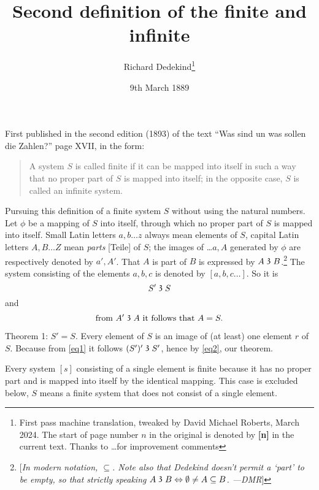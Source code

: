 \documentclass[leqno]{article}
\newcommand\partof{\mathrel{\raisebox{0.45ex}{$\mathfrak{3}$}}}
\begin{document}
\title{Second definition of the finite and infinite}
\author{Richard Dedekind\thanks{First pass machine translation, tweaked by David Michael Roberts, March 2024. The start of page number $n$ in the original is denoted by \textbf{[n]} in the current text. Thanks to \ldots for improvement comments}}
\date{9th March 1889}
\maketitle

First published in the second edition (1893) of the text ``Was sind un was sollen die Zahlen?'' page XVII, in the form: 

\begin{quote}
A system $S$ is called finite if it can be mapped into itself in such a way that no proper part of $S$ is mapped into itself; in the opposite case, $S$ is called an infinite system.
\end{quote}

Pursuing this definition of a finite system $S$ without using the natural numbers. 
Let $\phi$ be a mapping of $S$ into itself, through which no proper part of $S$ is mapped into itself.
Small Latin letters $a, b \ldots z$ always mean elements of $S$, capital Latin letters $A, B \ldots Z$ mean \emph{parts} [Teile] of $S$; the images of \ldots $a, A$ generated by $\phi$ are respectively denoted by $a', A'$. 
That $A$ is part of $B$ is expressed by $A \partof B$.\footnote{[\emph{In modern notation, $\subseteq$. Note also that Dedekind doesn't permit a `part' to be empty, so that strictly speaking $A\partof B \Leftrightarrow \emptyset \neq A \subseteq B$. ---DMR}]} The system consisting of the elements $a, b, c$ is denoted by $[a, b, c \ldots]$. 
So it is
\begin{equation}\label{eq1}
				S' \partof S 
\end{equation}
and
\begin{equation}\label{eq2}
		\text{from } A' \partof A \text{ it follows that } A = S.
\end{equation}

Theorem 1: $S' = S$. Every element of $S$ is an image of (at least) one element $r$ of $S$. Because from \eqref{eq1} it follows $(S')' \partof S'$, hence by \eqref{eq2}, our theorem.

Every system $[s]$ consisting of a single element is finite because it has no proper part and is mapped into itself by the identical mapping. 
This case is excluded below, $S$ means a finite system that does not consist of a single element.
\end{document}
